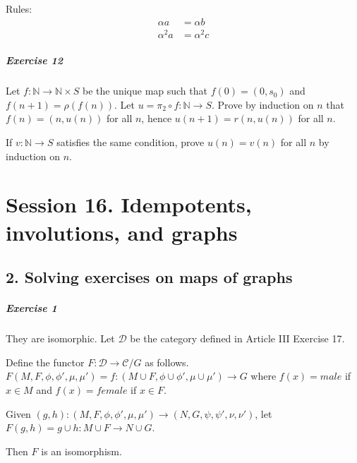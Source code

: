 \documentclass{report}
\begin{document}
    Rules:
    \begin{align*}
        \alpha a & = \alpha b \\
        \alpha^2 a & = \alpha^2 c
    \end{align*}

    \paragraph{Exercise 12}
    Let $f : \mathbb{N} \rightarrow \mathbb{N} \times S$ be the unique map such that $f(0) = (0, s_0)$
    and $f(n+1) = \rho(f(n))$. Let $u = \pi_2 \circ f : \mathbb{N} \rightarrow S$. Prove by induction on $n$
    that $f(n) = (n, u(n))$ for all $n$, hence $u(n+1) = r(n, u(n))$ for all $n$.

    If $v : \mathbb{N} \rightarrow S$ satisfies the same condition, prove $u(n) = v(n)$ for all $n$ by
    induction on $n$.

    \chapter{Session 16. Idempotents, involutions, and graphs}

    \section{2. Solving exercises on maps of graphs}

    \paragraph{Exercise 1}
    They are isomorphic. Let $\mathcal{D}$ be the category defined in Article III Exercise 17.

    Define the functor $F : \mathcal{D} \rightarrow \mathcal{C} / G$ as follows. $F(M, F, \phi, \phi', \mu, \mu')
    = f : (M \cup F, \phi \cup \phi', \mu \cup \mu') \rightarrow G$ where $f(x) = male$ if $x \in M$ and $f(x)
    = female$ if $x \in F$.

    Given $(g, h) : (M, F, \phi, \phi', \mu, \mu') \rightarrow (N, G, \psi, \psi', \nu, \nu')$, let
    $F(g,h) = g \cup h : M \cup F \rightarrow N \cup G$.

    Then $F$ is an isomorphism.
\end{document}
